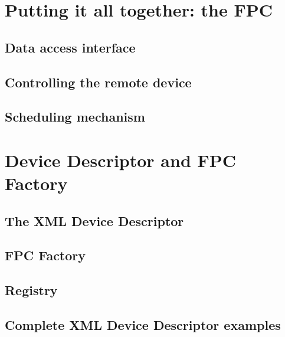 \section{Putting it all together: the FPC}

\subsection{Data access interface}

\subsection{Controlling the remote device}

\subsection{Scheduling mechanism}


\section{Device Descriptor and FPC Factory}

\subsection{The XML Device Descriptor}

\subsection{FPC Factory}

\subsection{Registry}

\subsection{Complete XML Device Descriptor examples}
